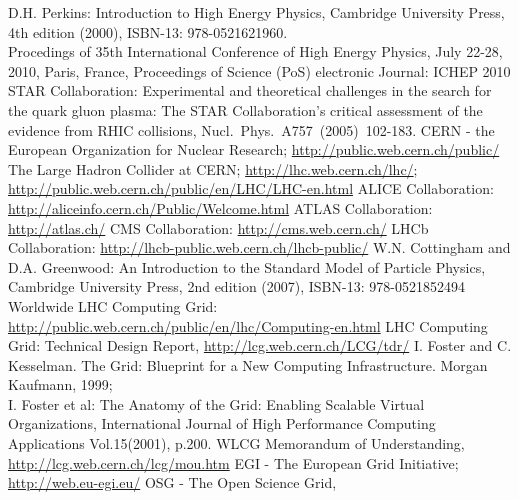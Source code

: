 \documentclass{intech}
\begin{document}
\begin{thebibliography}{100}

  D.H. Perkins:  Introduction to High Energy Physics, Cambridge
University Press,\\ 4th edition (2000), ISBN-13: 978-0521621960.\\
Procedings of 35th International Conference of High Energy Physics,
July 22-28, 2010, Paris, France,
     Proceedings of Science (PoS) electronic Journal: ICHEP 2010
%
  STAR Collaboration: Experimental and theoretical challenges in
the search for the quark gluon plasma: The STAR Collaboration's
     critical assessment of the evidence from RHIC collisions,
     Nucl.~Phys.~A757~(2005)~102-183.
%
 CERN - the European Organization for Nuclear Research;
\newline\url{http://public.web.cern.ch/public/}
%
  The Large Hadron Collider at
CERN; \url{http://lhc.web.cern.ch/lhc/};
\newline\url{http://public.web.cern.ch/public/en/LHC/LHC-en.html}
%
 ALICE
Collaboration: \url{http://aliceinfo.cern.ch/Public/Welcome.html}
%
 ATLAS Collaboration: \url{http://atlas.ch/}
%
  CMS Collaboration: \url{http://cms.web.cern.ch/}
%
 LHCb Collaboration: \url{http://lhcb-public.web.cern.ch/lhcb-public/}
%
 W.N. Cottingham and D.A. Greenwood: An Introduction to the Standard Model of
Particle Physics, Cambridge University Press, 2nd edition (2007), ISBN-13: 978-0521852494
%
 Worldwide LHC Computing Grid:
\newline\url{http://public.web.cern.ch/public/en/lhc/Computing-en.html}
%
%
 LHC Computing Grid: Technical Design Report,
\newline\url{http://lcg.web.cern.ch/LCG/tdr/}
%
 I. Foster and C. Kesselman. The Grid: Blueprint for a New Computing Infrastructure.
Morgan Kaufmann, 1999;\\
     I. Foster et al: The Anatomy of the Grid: Enabling Scalable Virtual Organizations,
     International Journal of High Performance
     Computing Applications Vol.15(2001), p.200.
%
 WLCG Memorandum of Understanding,
\newline\url{http://lcg.web.cern.ch/lcg/mou.htm}
%
 EGI - The European Grid Initiative; \url{http://web.eu-egi.eu/}
%
 OSG - The Open Science Grid,

\end{thebibliography}
\end{document}
